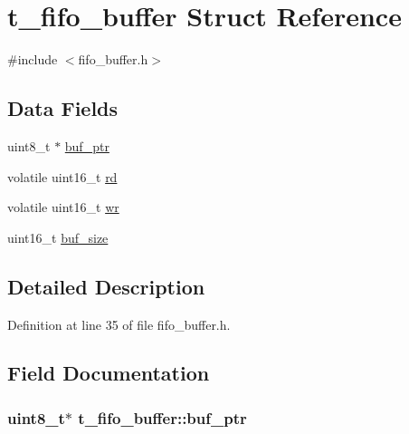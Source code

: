 \hypertarget{structt__fifo__buffer}{\section{t\-\_\-fifo\-\_\-buffer \-Struct \-Reference}
\label{structt__fifo__buffer}
}


{\ttfamily \#include $<$fifo\-\_\-buffer.\-h$>$}

\subsection*{\-Data \-Fields}
\begin{DoxyCompactItemize}
\item 
uint8\-\_\-t $\ast$ \hyperlink{structt__fifo__buffer_af8dc86ee1c0f0d5c3e44585cdc876da7}{buf\-\_\-ptr}
\item 
volatile uint16\-\_\-t \hyperlink{structt__fifo__buffer_af64a7e9ffdbe3eea93ad06b891189179}{rd}
\item 
volatile uint16\-\_\-t \hyperlink{structt__fifo__buffer_a499ed012a0f43ac65deb1bbbe28689fd}{wr}
\item 
uint16\-\_\-t \hyperlink{structt__fifo__buffer_a2ffa256dbcc216fcf1300aff50d41c3e}{buf\-\_\-size}
\end{DoxyCompactItemize}


\subsection{\-Detailed \-Description}


\-Definition at line 35 of file fifo\-\_\-buffer.\-h.



\subsection{\-Field \-Documentation}
\hypertarget{structt__fifo__buffer_af8dc86ee1c0f0d5c3e44585cdc876da7}{
\subsubsection[{buf\-\_\-ptr}]{\setlength{\rightskip}{0pt plus 5cm}uint8\-\_\-t$\ast$ {\bf t\-\_\-fifo\-\_\-buffer\-::buf\-\_\-ptr}}}\label{structt__fifo__buffer_af8dc86ee1c0f0d5c3e44585cdc876da7}


